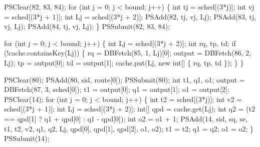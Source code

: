 \documentclass{article}
\def\nwendcode{\endtrivlist \endgroup}
\let\nwdocspar=\par
\theoremstyle{definition}
\begin{document}
PSClear(82, 83, 84);
for (int j = 0; j < bound; j++) \{
  int tj = sched[(3*j)];
  int vj = sched[(3*j + 1)];
  int Lj = sched[(3*j + 2)];
  PSAdd(82, tj, vj, Lj);
  PSAdd(83, tj, vj, Lj);
  PSAdd(84, tj, vj, Lj);
\}
PSSubmit(82, 83, 84);
\nwendcode{}\nwdocspar
\nwenddocs{}\endmoddef{}
for (int j = 0; j < bound; j++) \{
  int Lj = sched[(3*j + 2)];
  int rq, tp, td;
  if (!cache.containsKey(Lj)) \{
    rq = DBFetch(85, 1, Lj)[0];
    output = DBFetch(86, 2, Lj);
    tp = output[0];
    td = output[1];
    cache.put(Lj, new int[] \{ rq, tp, td \});
  \}
\}
\nwendcode{}\nwdocspar
\nwenddocs{}\endmoddef{}
PSClear(80);
PSAdd(80, sid, route[0]);
PSSubmit(80);
int t1, q1, o1;
output = DBFetch(87, 3, sched[0]);
t1 = output[0];
q1 = output[1];
o1 = output[2];
PSClear(14);
for (int j = 0; j < bound; j++) \{
  int t2 = sched[(3*j)];
  int v2 = sched[(3*j + 1)];
  int Lj = sched[(3*j + 2)];
  int[] qpd = cache.get(Lj);
  int q2 = (t2 == qpd[1] ? q1 + qpd[0] : q1 - qpd[0]);
  int o2 = o1 + 1;
  PSAdd(14, sid, sq, se, t1, t2, v2, q1, q2, Lj,
        qpd[0], qpd[1], qpd[2], o1, o2);
  t1 = t2;
  q1 = q2;
  o1 = o2;
\}
PSSubmit(14);
\nwendcode{}\nwdocspar
\end{document}
